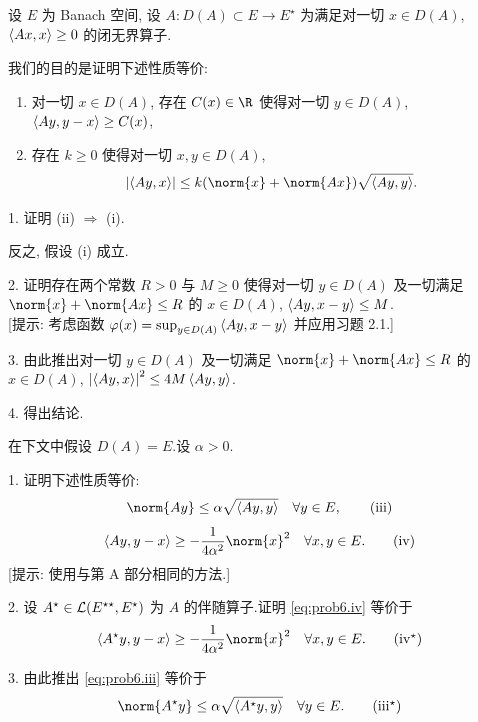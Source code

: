 \begin{problem}[第 1, 2 章]
\label{prob:6}
设 $E$ 为 Banach 空间, 设 $A:D(A)\subset E\to E^\star$ 为满足对一切
$x\in D(A)$, $\left\langle Ax,x\right\rangle\ge0$ 的闭无界算子.


我们的目的是证明下述性质等价:
\begin{enumerate}[label=(\roman*), itemsep=0.1em]
	\item 对一切 $x\in D(A)$, 存在 $C(x)\in\R$ 使得对一切 $y\in D(A)$, $\left\langle Ay,y-x\right\rangle\ge C(x)$,
	\item 存在 $k\ge0$ 使得对一切 $x,y\in D(A)$,
	\begin{equation*}
	\abs{\dual{Ay}{x}}\le k(\norm{x}+\norm{Ax})\sqrt{\dual{Ay}{y}}.
	\end{equation*}
\end{enumerate}

1. 证明 (ii) $\Rightarrow$ (i).

反之, 假设 (i) 成立.

2. 证明存在两个常数 $R>0$ 与 $M\ge0$ 使得对一切 $y\in D(A)$ 及一切满足
$\norm{x}+\norm{Ax}\le R$ 的 $x\in D(A)$, $\left\langle Ay,x-y\right\rangle\le M$.\\
{[提示: 考虑函数 $\varphi(x)=\sup_{y\in D(A)}\left\langle Ay,x-y\right\rangle$ 并应用习题 2.1.]}

3. 由此推出对一切 $y\in D(A)$ 及一切满足 $\norm{x}+\norm{Ax}\le R$ 的
$x\in D(A)$, $\left|\left\langle Ay,x\right\rangle\right|^2\le4M\left\langle Ay,y\right\rangle$.

4. 得出结论.


在下文中假设 $D(A)=E$.设 $\alpha>0$.

1. 证明下述性质等价:
\begin{equation}
\norm{Ay}\le\alpha\sqrt{\dual{Ay}{y}}\quad\forall y\in E,
\tag{iii}
\label{eq:prob6.iii}
\end{equation}
\begin{equation}
\dual{Ay}{y-x}\ge-\frac1{4\alpha^2}\norm{x}^2\quad\forall x,y\in E.
\tag{iv}
\label{eq:prob6.iv}
\end{equation}
[提示: 使用与第 A 部分相同的方法.]

2. 设 $A^\star\in\mathcal{L}(E^{\star\star},E^\star)$ 为 $A$ 的伴随算子.证明 \eqref{eq:prob6.iv} 等价于
\begin{equation}
\dual{A^\star y}{y-x}\ge-\frac1{4\alpha^2}\norm{x}^2\quad\forall x,y\in E.
\tag{iv$^\star$}
\label{eq:prob6.ivstar}
\end{equation}

3. 由此推出 \eqref{eq:prob6.iii} 等价于
\begin{equation}
\norm{A^\star y}\le\alpha\sqrt{\dual{A^\star y}{y}}\quad\forall y\in E.
\tag{iii$^\star$}
\label{eq:prob6.iiistar}
\end{equation}
\end{problem}

